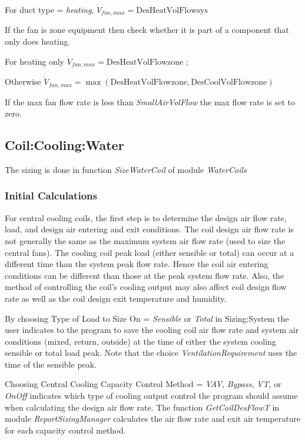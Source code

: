 For duct type = \emph{heating}, \(\dot{V}_{fan,max} = \text{DesHeatVolFlowsys}\)

If the fan is zone equipment then check whether it is part of a component that only does heating.

For heating only \(\dot{V}_{fan,max} = \text{DesHeatVolFlowzone}\) ;

Otherwise \(\dot{V}_{fan,max} = \max\left(\text{DesHeatVolFlowzone},\text{DesCoolVolFlowzone}\right)\)

If the max fan flow rate is less than \emph{SmallAirVolFlow} the max flow rate is set to zero.

\subsection{Coil:Cooling:Water}\label{coilcoolingwater}

The sizing is done in function \emph{SizeWaterCoil} of module \emph{WaterCoils}

\subsubsection{Initial Calculations}\label{initial-calculations}

For central cooling coils, the first step is to determine the design air flow rate, load, and design air entering and exit conditions. The coil design air flow rate is not generally the same as the maximum system air flow rate (used to size the central fans). The cooling coil peak load (either sensible or total) can occur at a different time than the system peak flow rate. Hence the coil air entering conditions can be different than those at the peak system flow rate. Also, the method of controlling the coil's cooling output may also affect coil design flow rate as well as the coil design exit temperature and humidity.

By choosing Type of Load to Size On = \emph{Sensible} or \emph{Total} in Sizing:System the user indicates to the program to save the cooling coil air flow rate and system air conditions (mixed, return, outside) at the time of either the system cooling sensible or total load peak. Note that the choice \emph{VentilationRequirement} uses the time of the sensible peak.

Choosing Central Cooling Capacity Control Method = \emph{VAV}, \emph{Bypass}, \emph{VT}, or \emph{OnOff} indicates which type of cooling output control the program should assume when calculating the design air flow rate. The function \emph{GetCoilDesFlowT} in module \emph{ReportSizingManager} calculates the air flow rate and exit air temperature for each capacity control method.

